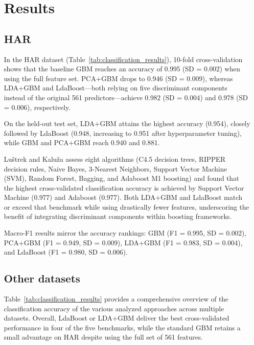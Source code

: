 \documentclass[11pt,a4paper]{article}
\begin{document}
\section*{Results}
\subsection*{HAR}
In the HAR dataset (Table~\ref{tab:classification_results}), 10-fold cross-validation shows that the baseline GBM reaches an accuracy of 0.995 (SD = 0.002) when using the full feature set. PCA+GBM drops to 0.946 (SD = 0.009), whereas LDA+GBM and LdaBoost---both relying on five discriminant components instead of the original 561 predictors---achieve 0.982 (SD = 0.004) and 0.978 (SD = 0.006), respectively.

On the held-out test set, LDA+GBM attains the highest accuracy (0.954), closely followed by LdaBoost (0.948, increasing to 0.951 after hyperparameter tuning), while GBM and PCA+GBM reach 0.940 and 0.881.

Luštrek and Kaluža \citep{luvstrek2009fall} assess eight algorithms (C4.5 decision trees, RIPPER decision rules, Naive Bayes, 3-Nearest Neighbors, Support Vector Machine (SVM), Random Forest, Bagging, and Adaboost M1 boosting) and found that the highest cross-validated classification accuracy is achieved by Support Vector Machine (0.977) and Adaboost (0.977). Both LDA+GBM and LdaBoost match or exceed that benchmark while using drastically fewer features, underscoring the benefit of integrating discriminant components within boosting frameworks.

Macro-F1 results mirror the accuracy rankings: GBM (F1 = 0.995, SD = 0.002), PCA+GBM (F1 = 0.949, SD = 0.009), LDA+GBM (F1 = 0.983, SD = 0.004), and LdaBoost (F1 = 0.980, SD = 0.006).


\subsection*{Other datasets}

Table~\ref{tab:classification_results} provides a comprehensive overview of the classification accuracy of the various analyzed approaches across multiple datasets. Overall, LdaBoost or LDA+GBM deliver the best cross-validated performance in four of the five benchmarks, while the standard GBM retains a small advantage on HAR despite using the full set of 561 features.
\end{document}
